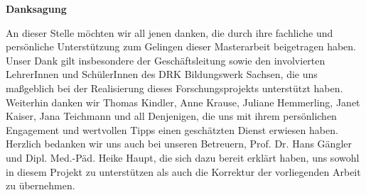\vspace*{\fill}
\begin{center}
\textbf{Danksagung}
\end{center}

\noindent 
An dieser Stelle möchten wir all jenen danken, die durch ihre fachliche und persönliche Unterstützung zum Gelingen dieser Masterarbeit beigetragen haben.\\[0,5cm]
Unser Dank gilt insbesondere der Geschäftsleitung sowie den involvierten LehrerInnen und SchülerInnen des DRK Bildungswerk Sachsen, die uns maßgeblich bei der Realisierung dieses Forschungsprojekts unterstützt haben.\\[0,5cm]
Weiterhin danken wir Thomas Kindler, Anne Krause, Juliane Hemmerling, Janet Kaiser, Jana Teichmann und all Denjenigen, die uns mit ihrem persönlichen Engagement und wertvollen Tipps einen geschätzten Dienst erwiesen haben.\\[0,5cm]
Herzlich bedanken wir uns auch bei unseren Betreuern, Prof. Dr. Hans Gängler und Dipl. Med.-Päd. Heike Haupt, die sich dazu bereit erklärt haben, uns sowohl in diesem Projekt zu unterstützen als auch die Korrektur der vorliegenden Arbeit zu übernehmen.
\vspace{\fill}